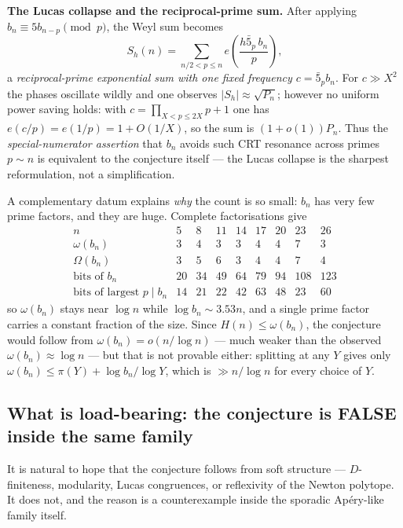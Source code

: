 \medskip
\noindent\textbf{The Lucas collapse and the reciprocal-prime sum.}  After applying
$b_n\equiv5b_{n-p}\pmod p$, the Weyl sum becomes
\[
  S_h(n)=\sum_{n/2<p\le n}e\!\left(\frac{h\bar5_p\,b_n}p\right),
\]
a \emph{reciprocal-prime exponential sum with one fixed frequency $c=\bar5_pb_n$}.  For
$c\gg X^2$ the phases oscillate wildly and one observes
$|S_h|\approx\sqrt{P_n}$; however no uniform power saving holds: with
$c=\prod_{X<p\le2X}p+1$ one has $e(c/p)=e(1/p)=1+O(1/X)$, so the sum is $(1+o(1))P_n$.
Thus the \emph{special-numerator assertion} that $b_n$ avoids such CRT resonance across primes
$p\sim n$ is equivalent to the conjecture itself — the Lucas collapse is the sharpest
reformulation, not a simplification.

A complementary datum explains \emph{why} the count is so small: $b_n$ has very few prime
factors, and they are huge.  Complete factorisations give
\[
\begin{array}{c|cccccccc}
 n&5&8&11&14&17&20&23&26\\ \hline
 \omega(b_n)&3&4&3&3&4&4&7&3\\
 \Omega(b_n)&3&5&6&3&4&4&7&4\\
 \text{bits of }b_n&20&34&49&64&79&94&108&123\\
 \text{bits of largest }p\mid b_n&14&21&22&42&63&48&23&60
\end{array}
\]
so $\omega(b_n)$ stays near $\log n$ while $\log b_n\sim3.53n$, and a single prime factor
carries a constant fraction of the size.  Since $H(n)\le\omega(b_n)$, the conjecture would
follow from $\omega(b_n)=o(n/\log n)$ — much weaker than the observed $\omega(b_n)\approx\log n$
— but that is not provable either: splitting at any $Y$ gives only
$\omega(b_n)\le\pi(Y)+\log b_n/\log Y$, which is $\gg n/\log n$ for every choice of $Y$.

\subsection{What is load-bearing: the conjecture is FALSE inside the same family}
\label{subsec:load-bearing}

It is natural to hope that the conjecture follows from soft structure — $D$-finiteness,
modularity, Lucas congruences, or reflexivity of the Newton polytope.  It does not, and the
reason is a counterexample inside the sporadic Ap\'ery-like family itself.

